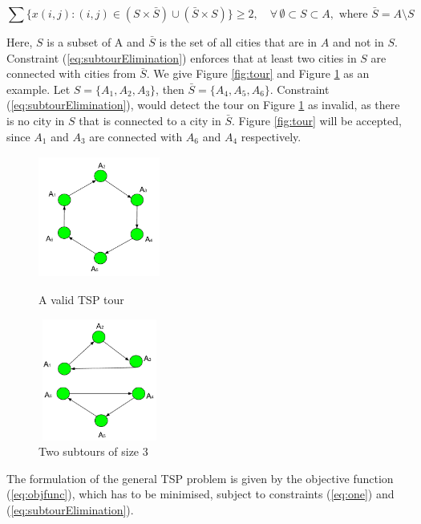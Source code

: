 \documentclass{mprop}
\theoremstyle{definition}
\begin{document}
\begin{equation}
\label{eq:subtourElimination}
\sum \{x(i,j) : (i,j) \in (S \times \bar{S}) \cup (\bar{S} \times S)\} \geq 2, \quad \forall \, \emptyset \subset S \subset A, \textrm{ where } \bar{S} = A \setminus S
\end{equation}

Here, $S$ is a subset of A and $\bar{S}$ is the set of all cities that are in $A$ and not in $S$. Constraint (\ref{eq:subtourElimination}) enforces that at least two cities in $S$ are connected with cities from $\bar{S}$. We give Figure \ref{fig:tour} and Figure \ref{fig:subtours} as an example. Let $S = \{A_{1},A_{2},A_{3}\}$, then $\bar{S} = \{A_{4},A_{5},A_{6}\}$. Constraint (\ref{eq:subtourElimination}), would detect the tour on Figure \ref{fig:subtours} as invalid, as there is no city in $S$ that is connected to a city in $\bar{S}$. Figure \ref{fig:tour} will be accepted, since $A_{1}$ and $A_{3}$ are connected with $A_{6}$ and $A_{4}$ respectively.

\begin{figure}
\centering
\begin{minipage}{.5\textwidth}
  \centering
  \includegraphics[width=4cm, height=4cm]{images/valid.png}
  \caption{A valid TSP tour}
  \label{fig:tour}
\end{minipage}%
\begin{minipage}{.5\textwidth}
  \centering
  \includegraphics[width=4cm, height=4cm]{images/invalid.png}
  \caption{Two subtours of size 3}
  \label{fig:subtours}
\end{minipage}
\end{figure}

The formulation of the general TSP problem is given by the objective function (\ref{eq:objfunc}), which has to be minimised, subject to constraints (\ref{eq:one}) and (\ref{eq:subtourElimination}).
\end{document}
